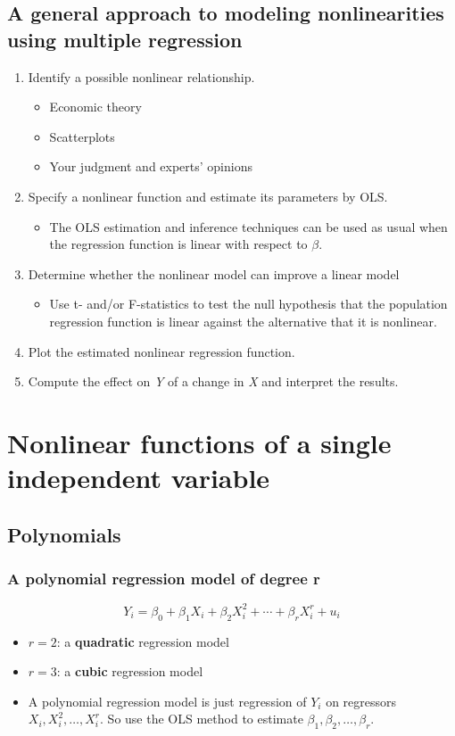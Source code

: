 \documentclass[a4paper,11pt]{article}
\begin{document}
\subsection{A general approach to modeling nonlinearities using multiple regression}
\label{sec:org7ef2624}
\begin{enumerate}
\item Identify a possible nonlinear relationship.
\begin{itemize}
\item Economic theory
\item Scatterplots
\item Your judgment and experts' opinions
\end{itemize}
\item Specify a nonlinear function and estimate its parameters by OLS.
\begin{itemize}
\item The OLS estimation and inference techniques can be used as usual
when the regression function is linear with respect to \(\beta\).
\end{itemize}
\item Determine whether the nonlinear model can improve a linear model
\begin{itemize}
\item Use t- and/or F-statistics to test the null hypothesis that the
population regression function is linear against the alternative
that it is nonlinear.
\end{itemize}
\item Plot the estimated nonlinear regression function.
\item Compute the effect on \emph{Y} of a change in \emph{X} and interpret the
results.
\end{enumerate}


\section{Nonlinear functions of a single independent variable}
\label{sec:orga352598}
\subsection{Polynomials}
\label{sec:org9b7e5bc}
\subsubsection*{A polynomial regression model of degree r}
\label{sec:org0504295}
\begin{equation}
\label{eq:poly-r}
Y_i = \beta_0 + \beta_1 X_i + \beta_2 X_i^2 + \cdots + \beta_r X_i^r + u_i
\end{equation}
\begin{itemize}
\item \(r = 2\): a \textbf{quadratic} regression model
\item \(r = 3\): a \textbf{cubic} regression model
\item A polynomial regression model is just regression of \(Y_i\) on
regressors \(X_i, X_i^2, \ldots, X_i^r\). So use the OLS method to
estimate \(\beta_1, \beta_2, \ldots, \beta_r\).
\end{itemize}
\end{document}
